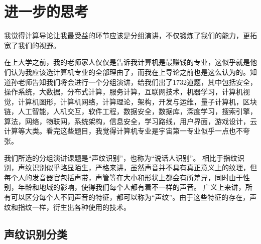 \documentclass{article}
\begin{document}
\section{进一步的思考}
我觉得计算导论让我最受益的环节应该是分组演讲，不仅锻炼了我们的能力，更拓宽了我们的视野。\par
在上大学之前，我的老师家人仅仅是告诉我计算机是最赚钱的专业，这似乎就是他们认为我应该选计算机专业的全部理由了，而我在上导论之前也是这么认为的。知道孙老师告知我们将会进行一个分组演讲，给我们出了1732道题，其中包括安全，操作系统，大数据，分布式计算，服务计算，互联网技术，机器学习，计算机视觉，计算机图形，计算机网络，计算理论，架构，开发与运维，量子计算机，区块链，人工智能，人机交互，软件工程，数据安全，数据库，深度学习，搜索引擎，算法，网络，物联网，系统架构，信息安全，学习路线，用户界面，游戏设计，云计算等大类。看完这些题目，我觉得计算机专业是宇宙第一专业似乎一点也不夸张。\par
我们所选的分组演讲课题是“声纹识别”，也称为“说话人识别”。
相比于指纹识别，声纹识别似乎略显陌生，严格来讲，虽然声音并不具有真正意义上的纹理，但每个人的发音器官包括声带，声管等在大小和形状上都会有所差异，同时由于性别，年龄和地域的影响，使得我们每个人都有着不一样的声音。
广义上来讲，所有可以区分每个人不同声音的特征，都可以称为“声纹”。由于这些特征的存在，声纹和指纹一样，衍生出各种使用的技术。\par
\subsection{声纹识别分类}
\end{document}
